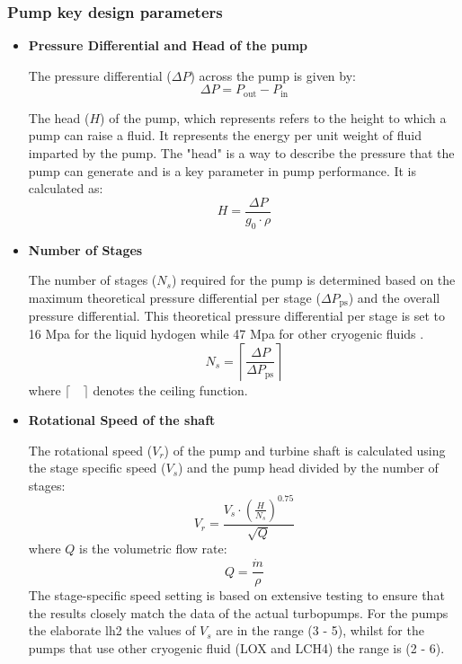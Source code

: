 \subsubsection{Pump key design parameters}
\begin{itemize}
    
 \item\textbf{Pressure Differential and Head of the pump}

The pressure differential (\(\Delta P\)) across the pump is given by:
\begin{equation}
\Delta P = P_{\text{out}} - P_{\text{in}}
\end{equation}

The head (\(H\)) of the pump, which represents refers to the height to which a pump can raise a fluid. It represents the energy per unit weight of fluid imparted by the pump. The "head" is a way to describe the pressure that the pump can generate and is a key parameter in pump performance. It is calculated as:
\begin{equation}
H = \frac{\Delta P}{g_0 \cdot \rho}
\end{equation}
\item\textbf{Number of Stages}

The number of stages (\(N_s\)) required for the pump is determined based on the maximum theoretical pressure differential per stage (\(\Delta P_{\text{ps}}\)) and the overall pressure differential.
This theoretical pressure differential per stage is set to 16 Mpa for the liquid hydogen while 47 Mpa for other cryogenic fluids \cite{humble95}.
\begin{equation}
N_s = \left\lceil \frac{\Delta P}{\Delta P_{\text{ps}}} \right\rceil
\end{equation}
where \(\lceil \quad \rceil\) denotes the ceiling function.

\item\textbf{Rotational Speed of the shaft}

The rotational speed (\(V_r\)) of the pump and turbine shaft is calculated using the stage specific speed (\(V_s\)) and the pump head divided by the number of stages:
\begin{equation}
V_r = \frac{V_s \cdot \left(\frac{H}{N_s}\right)^{0.75}}{\sqrt{Q}}
\end{equation}
where \(Q\) is the volumetric flow rate:
\begin{equation}
Q = \frac{\dot{m}}{\rho}
\end{equation}
The stage-specific speed setting is based on extensive testing to ensure that the results closely match the data of the actual turbopumps.
For the pumps the elaborate \acrlong{lh2} the values of \(V_s\) are in the range (3 - 5), whilst for the pumps that use other cryogenic fluid (LOX and LCH4) the range is (2 - 6).


\end{itemize}
